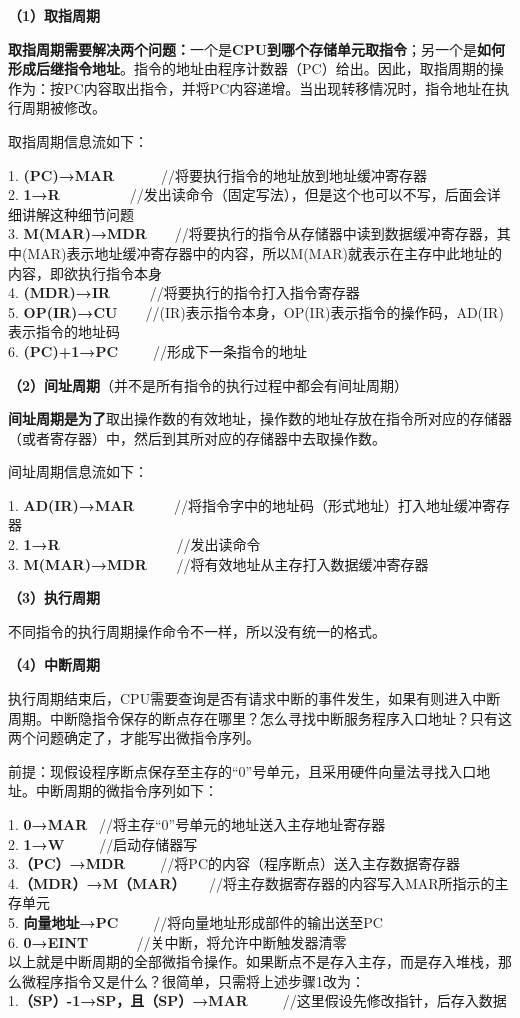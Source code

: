 {\textbf{（1）取指周期}}

\textbf{取指周期需要解决两个问题：}一个是\textbf{CPU到哪个存储单元取指令}；另一个是\textbf{如何形成后继指令地址}。指令的地址由程序计数器（PC）给出。因此，取指周期的操作为：按PC内容取出指令，并将PC内容递增。当出现转移情况时，指令地址在执行周期被修改。

取指周期信息流如下：

1. \textbf{(PC)→MAR} ~ ~ ~ ~//将要执行指令的地址放到地址缓冲寄存器\\
2. \textbf{1→R} ~ ~ ~ ~ ~
~//发出读命令（固定写法），但是这个也可以不写，后面会详细讲解这种细节问题\\
3. \textbf{M(MAR)→MDR} ~ ~
//将要执行的指令从存储器中读到数据缓冲寄存器，其中(MAR)表示地址缓冲寄存器中的内容，所以M(MAR)就表示在主存中此地址的内容，即欲执行指令本身\\
4. \textbf{(MDR)→IR} ~ ~ ~ //将要执行的指令打入指令寄存器\\
5. \textbf{OP(IR)→CU} ~ ~
//(IR)表示指令本身，OP(IR)表示指令的操作码，AD(IR)表示指令的地址码\\
6. \textbf{(PC)+1→PC} ~ ~ ~//形成下一条指令的地址

{\textbf{（2）间址周期}}（{并不是所有指令的执行过程中都会有间址周期}）

\textbf{间址周期是为了}取出操作数的有效地址，操作数的地址存放在指令所对应的存储器（或者寄存器）中，然后到其所对应的存储器中去取操作数。

间址周期信息流如下：

1. \textbf{AD(IR)→MAR} ~ ~ ~
//将指令字中的地址码（形式地址）打入地址缓冲寄存器\\
2. \textbf{1→R} ~ ~ ~ ~ ~ ~ ~ ~ ~ ~//发出读命令\\
3. \textbf{M(MAR)→MDR ~} ~ //将有效地址从主存打入数据缓冲寄存器

{\textbf{（3）执行周期}}

不同指令的执行周期操作命令不一样，所以没有统一的格式。

{\textbf{（4）中断周期}}

执行周期结束后，{CPU}需要查询是否有请求中断的事件发生，如果有则进入中断周期。中断隐指令保存的断点存在哪里？怎么寻找中断服务程序入口地址？只有这两个问题确定了，才能写出微指令序列。

{前提：}现假设程序断点保存至主存的``0''号单元，且采用硬件向量法寻找入口地址。中断周期的微指令序列如下：

1. \textbf{0→MAR} ~//将主存``0''号单元的地址送入主存地址寄存器\\
2. \textbf{1→W} ~ ~ ~//启动存储器写\\
3.\textbf{（PC）→MDR}~ ~ ~ //将PC的内容（程序断点）送入主存数据寄存器\\
4.\textbf{（MDR）→M（MAR）} ~
~//将主存数据寄存器的内容写入MAR所指示的主存单元\\
5. \textbf{向量地址→PC} ~ ~ ~//将向量地址形成部件的输出送至PC\\
6. \textbf{0→EINT ~} ~ ~ ~//关中断，将允许中断触发器清零\\
以上就是中断周期的全部微指令操作。如果断点不是存入主存，而是存入堆栈，那么微程序指令又是什么？很简单，只需将上述步骤1改为：\\
1.\textbf{（SP）-1→SP，且（SP）→MAR ~
~~}//这里假设先修改指针，后存入数据
